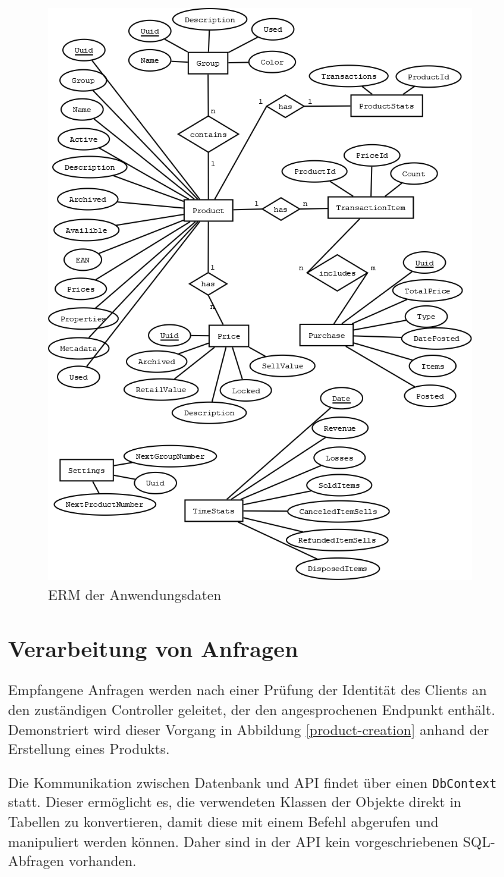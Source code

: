 \begin{figure}[ht]
	\centering
	\includegraphics[width=1\linewidth]{ERM.png}
	\caption{ERM der Anwendungsdaten}
	\label{data-erm}
\end{figure}

\subsection{Verarbeitung von Anfragen}
Empfangene Anfragen werden nach einer Prüfung der Identität des Clients an den zuständigen Controller geleitet, der den angesprochenen Endpunkt enthält.
Demonstriert wird dieser Vorgang in Abbildung \vref{product-creation} anhand der Erstellung eines Produkts.

Die Kommunikation zwischen Datenbank und API findet über einen \texttt{DbContext} statt.
Dieser ermöglicht es, die verwendeten Klassen der Objekte direkt in Tabellen zu konvertieren, damit diese mit einem Befehl abgerufen und manipuliert werden können. Daher sind in der API kein vorgeschriebenen SQL-Abfragen vorhanden.

